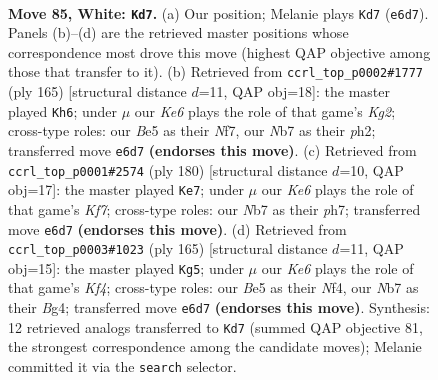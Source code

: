 \documentclass[11pt]{article}
\begin{document}
\clearpage

\begin{figure}[p]\centering
\begin{subfigure}{0.46\textwidth}\centering
\resizebox{\linewidth}{!}{%
\newchessgame
\chessboard[
  setfen={5k2/1NP5/4K3/4B3/8/8/2r5/8 w - - 83 85},
  showmover=false,
  pgfstyle=straightmove, color=movearrow, markmove={e6-d7}
]}
\caption{}
\end{subfigure}\hfill
\begin{subfigure}{0.46\textwidth}\centering
\resizebox{\linewidth}{!}{%
\newchessgame
\chessboard[
  setfen={8/5nk1/R5p1/8/8/5K2/7P/8 b - - 59 83},
  showmover=false,
  pgfstyle=straightmove, color=movearrow, markmove={g7-h6}
]}
\caption{}
\end{subfigure}
\\[4pt]
\begin{subfigure}{0.46\textwidth}\centering
\resizebox{\linewidth}{!}{%
\newchessgame
\chessboard[
  setfen={8/5KBp/r6P/5k2/8/8/8/8 w - - 41 91},
  showmover=false,
  pgfstyle=straightmove, color=movearrow, markmove={f7-e7}
]}
\caption{}
\end{subfigure}\hfill
\begin{subfigure}{0.46\textwidth}\centering
\resizebox{\linewidth}{!}{%
\newchessgame
\chessboard[
  setfen={7R/8/8/5k2/5nbp/8/7K/8 b - - 17 83},
  showmover=false,
  pgfstyle=straightmove, color=movearrow, markmove={f5-g5}
]}
\caption{}
\end{subfigure}
\caption{\textbf{Move 85, White: \texttt{Kd7}.} (a) Our position; Melanie plays \texttt{Kd7} (\texttt{e6d7}). Panels (b)--(d) are the retrieved master positions whose correspondence most drove this move (highest QAP objective among those that transfer to it). (b) Retrieved from \texttt{ccrl\_top\_p0002\#1777} (ply 165) [structural distance $d$=11, QAP obj=18]: the master played \texttt{Kh6}; under $\mu$ our \emph{Ke6} plays the role of that game's \emph{Kg2}; cross-type roles: our \emph{B}e5 as their \emph{N}f7, our \emph{N}b7 as their \emph{p}h2; transferred move \texttt{e6d7} \textbf{(endorses this move)}. (c) Retrieved from \texttt{ccrl\_top\_p0001\#2574} (ply 180) [structural distance $d$=10, QAP obj=17]: the master played \texttt{Ke7}; under $\mu$ our \emph{Ke6} plays the role of that game's \emph{Kf7}; cross-type roles: our \emph{N}b7 as their \emph{p}h7; transferred move \texttt{e6d7} \textbf{(endorses this move)}. (d) Retrieved from \texttt{ccrl\_top\_p0003\#1023} (ply 165) [structural distance $d$=11, QAP obj=15]: the master played \texttt{Kg5}; under $\mu$ our \emph{Ke6} plays the role of that game's \emph{Kf4}; cross-type roles: our \emph{B}e5 as their \emph{N}f4, our \emph{N}b7 as their \emph{B}g4; transferred move \texttt{e6d7} \textbf{(endorses this move)}. Synthesis: 12 retrieved analogs transferred to \texttt{Kd7} (summed QAP objective 81, the strongest correspondence among the candidate moves); Melanie committed it via the \texttt{search} selector.}
\label{fig:thought-m168}
\end{figure}
\end{document}

